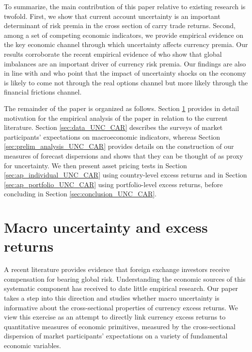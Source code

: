 To summarize, the main contribution of this paper relative to existing research is twofold. First, we show that current account uncertainty is an important determinant of risk premia in the cross section of carry trade returns. Second, among a set of competing economic indicators, we provide empirical evidence on the key economic channel through which uncertainty affects currency premia. Our results corroborate the recent empirical evidence of \citet{dellacorte_etal2015} who show that global imbalances are an important driver of currency risk premia. Our findings are also in line with \citet{bachmann_etal2013} and \citet{gilchrist_etal2014} who point that the impact of uncertainty shocks on the economy is likely to come not through the real options channel but more likely through the financial frictions channel.

The remainder of the paper is organized as follows. Section \ref{sec:motivation_UNC_CAR} provides in detail motivation for the empirical analysis of the paper in relation to the current literature. Section \ref{sec:data_UNC_CAR} describes the surveys of market participants' expectations on macroeconomic indicators, whereas Section \ref{sec:prelim_analysis_UNC_CAR} provides details on the construction of our measures of forecast dispersions and shows that they can be thought of as proxy for uncertainty. We then present asset pricing tests in Section \ref{sec:ap_individual_UNC_CAR} using country-level excess returns and in Section \ref{sec:ap_portfolio_UNC_CAR} using portfolio-level excess returns, before concluding in Section \ref{sec:conclusion_UNC_CAR}.

\section{Macro uncertainty and excess returns} \label{sec:motivation_UNC_CAR}
A recent literature provides evidence that foreign exchange investors receive compensation for bearing global risk. Understanding the economic sources of this systematic component has received to date little empirical research. Our paper takes a step into this direction and studies whether macro uncertainty is informative about the cross-sectional properties of currency excess returns. We view this exercise as an attempt to directly link currency excess returns to quantitative measures of economic primitives, measured by the cross-sectional dispersion of market participants' expectations on a variety of fundamental economic variables.

